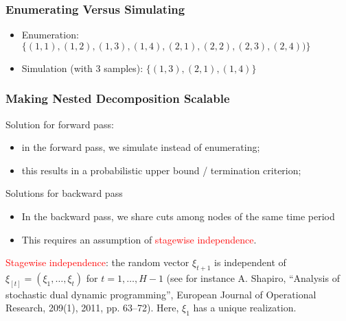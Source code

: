 \documentclass{beamer}
\begin{document}
\begin{frame}
	\frametitle{Enumerating Versus Simulating}

\begin{center}
\end{center}

\begin{itemize}
	\item 
	Enumeration: $\{(1, 1), (1, 2), (1, 3), (1, 4), (2, 1), (2, 2), (2,
		3), (2, 4))\}$
	\item 
	Simulation (with 3 samples): $\{(1, 3), (2, 1), (1, 4)\}$
\end{itemize}
\end{frame}

\begin{frame}
\frametitle{Making Nested Decomposition Scalable}

Solution for forward pass:
\begin{itemize}
	\item 
in the forward pass, we simulate instead of enumerating;
	\item 
this results in a probabilistic upper bound / termination
criterion;
\end{itemize}

\mbox{}

Solutions for backward pass
\begin{itemize}
	\item 
In the backward pass, we share cuts among nodes of the
same time period
\item
This requires an assumption of \textcolor{red}{stagewise independence}.
\end{itemize}

\mbox{}

\textcolor{red}{Stagewise independence}: the random vector $\xi_{t+1}$ is independent of $\xi_{[t]} = (\xi_1,\ldots, \xi_t)$ for $t = 1,\ldots, H-1$ (see for instance A. Shapiro, ``Analysis of stochastic dual dynamic programming'', European Journal of Operational Research, 209(1), 2011, pp. 63--72). Here, $\xi_1$ has a unique realization.

\end{frame}
\end{document}

